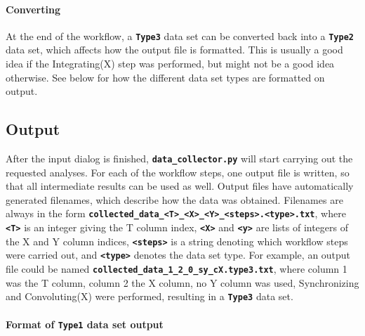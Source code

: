 \documentclass[a4paper,10pt,DIV=15,openany,twoside=false]{scrbook}
\newcommand{\ttt}[1]{\textbf{\texttt{#1}}}
\begin{document}
\paragraph{Converting}

At the end of the workflow, a \ttt{Type3} data set can be converted back into a \ttt{Type2} data set, which affects how the output file is formatted.
This is usually a good idea if the Integrating(X) step was performed, but might not be a good idea otherwise.
See below for how the different data set types are formatted on output.

\subsection{Output}

After the input dialog is finished, \ttt{data\_collector.py} will start carrying out the requested analyses.
For each of the workflow steps, one output file is written, so that all intermediate results can be used as well.
Output files have automatically generated filenames, which describe how the data was obtained.
Filenames are always in the form \ttt{collected\_data\_<T>\_<X>\_<Y>\_<steps>.<type>.txt}, where \ttt{<T>} is an integer giving the T column index, \ttt{<X>} and \ttt{<y>} are lists of integers of the X and Y column indices, \ttt{<steps>} is a string denoting which workflow steps were carried out, and \ttt{<type>} denotes the data set type.
For example, an output file could be named \ttt{collected\_data\_1\_2\_0\_sy\_cX.type3.txt}, where column 1 was the T column, column 2 the X column, no Y column was used, Synchronizing and Convoluting(X) were performed, resulting in a \ttt{Type3} data set.

\paragraph{Format of \ttt{Type1} data set output}
\end{document}
